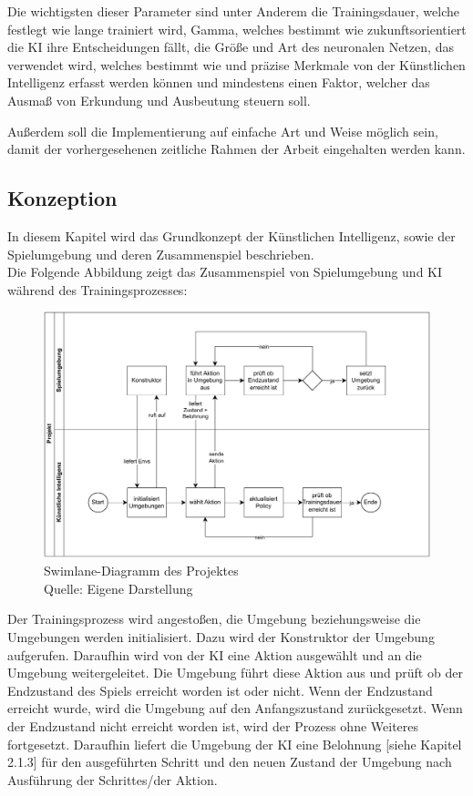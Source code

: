 Die wichtigsten dieser Parameter sind unter Anderem die Trainingsdauer, welche festlegt wie lange trainiert wird, Gamma, welches bestimmt wie zukunftsorientiert die KI ihre Entscheidungen fällt, die Größe und Art des neuronalen Netzen, das verwendet wird, welches bestimmt wie und präzise Merkmale von der Künstlichen Intelligenz erfasst werden können und mindestens einen Faktor, welcher das Ausmaß von Erkundung und Ausbeutung steuern soll. 

Außerdem soll die Implementierung auf einfache Art und Weise möglich sein, damit der vorhergesehenen zeitliche Rahmen der Arbeit eingehalten werden kann.
\subsection{Konzeption}
In diesem Kapitel wird das Grundkonzept der Künstlichen Intelligenz, sowie der Spielumgebung und deren Zusammenspiel beschrieben.\\

Die Folgende Abbildung zeigt das Zusammenspiel von Spielumgebung und KI während des Trainingsprozesses:

\nopagebreak
\begin{figure}[H]
	\includegraphics[width=1\textwidth]{Bilder/swimlane.drawio.pdf} 
	\caption[Swimlane-Diagramm des Projektes]{Swimlane-Diagramm des Projektes\\ Quelle: Eigene Darstellung}
\end{figure}	

Der Trainingsprozess wird angestoßen, die Umgebung beziehungsweise die Umgebungen werden initialisiert. Dazu wird der Konstruktor der Umgebung aufgerufen. Daraufhin wird von der KI eine Aktion ausgewählt und an die Umgebung weitergeleitet. Die Umgebung führt diese Aktion aus und prüft ob der Endzustand des Spiels erreicht worden ist oder nicht. Wenn der Endzustand erreicht wurde, wird die Umgebung auf den Anfangszustand zurückgesetzt. Wenn der Endzustand nicht erreicht worden ist, wird der Prozess ohne Weiteres fortgesetzt. Daraufhin liefert die Umgebung der KI eine Belohnung [siehe Kapitel 2.1.3] für den ausgeführten Schritt und den neuen Zustand der Umgebung nach Ausführung der Schrittes/der Aktion.


